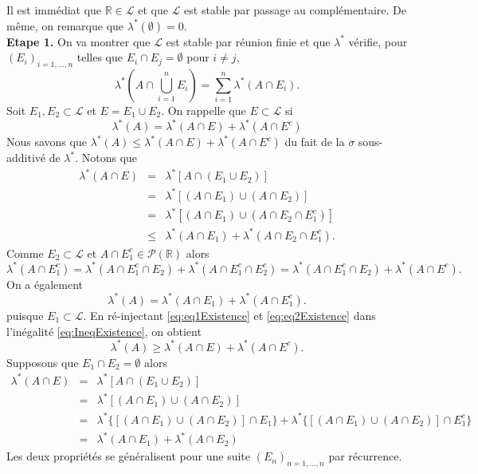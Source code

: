 \documentclass[8pt,notheorems]{beamer}
\def \R{\mathbb R}
\theoremstyle{definition}
\theoremstyle{example}
\theoremstyle{mystyle}
\theoremstyle{plain}
\begin{document}
\begin{frame}[allowframebreaks]
Il est immédiat que $\mathbb{R}\in \mathcal{L}$ et que $\mathcal{L}$ est stable par passage au complémentaire. De même, on remarque que $\lambda^{\ast}(\emptyset)=0$.\\
\textbf{Etape 1.} On va montrer que $\mathcal{L}$ est stable par réunion finie et que $\lambda^{\ast}$ vérifie, pour $(E_i)_{i=1,\ldots,n}$ telles que $E_i\cap E_j=\emptyset$ pour $i\neq j$,
$$\lambda^{\ast}\left(A\cap\bigcup_{i=1}^{n}E_i\right) =
\sum_{i=1}^{n}\lambda^{\ast}(A\cap E_i).
$$
Soit $E_1,E_2\subset\mathcal{L}$ et $E=E_1\cup E_2$. On rappelle que $E\subset\mathcal{L}$ si
$$
\lambda^{\ast}(A)=\lambda^{\ast}(A\cap E)+\lambda^{\ast}(A\cap E^{c})
$$
Nous savons que $\lambda^{\ast}(A)\leq\lambda^{\ast}(A\cap E)+\lambda^{\ast}(A\cap E^{c})$ du fait de la $\sigma$ sous-additivé de $\lambda^{\ast}$. Notons que
\begin{eqnarray}
\lambda^{\ast}(A\cap E)&=&\lambda^{\ast}[A\cap (E_1\cup E_2)]\nonumber\\
&=&\lambda^{\ast}[(A\cap E_1)\cup (A\cap E_2)]\nonumber\\
&=&\lambda^{\ast}[(A\cap E_1)\cup (A\cap E_2\cap E_1^{c})]\nonumber\\
&\leq& \lambda^{\ast}(A\cap E_1)+\lambda^{\ast}(A\cap E_2\cap E_1^{c}).\label{eq:IneqExistence}
\end{eqnarray}
Comme $E_{2}\subset\mathcal{L}$ et $A\cap E_{1}^{c}\in\mathcal{P}(\R)$ alors
\begin{equation}\label{eq:eq1Existence}
\lambda^{\ast}(A\cap E_{1}^{c})=\lambda^{\ast}(A\cap E_{1}^{c}\cap E_{2})+\lambda^{\ast}(A\cap E_{1}^{c}\cap E_{2}^{c})=\lambda^{\ast}(A\cap E_{1}^{c}\cap E_{2})+\lambda^{\ast}(A\cap E^{c}).
\end{equation}
On a également
\begin{equation}\label{eq:eq2Existence}
\lambda^{\ast}(A)=\lambda^{\ast}(A\cap E_{1})+\lambda^{\ast}(A\cap E_{1}^{c}).
\end{equation}
puisque $E_1\subset\mathcal{L}$. En ré-injectant \eqref{eq:eq1Existence} et \eqref{eq:eq2Existence} dans l'inégalité \eqref{eq:IneqExistence}, on obtient
$$
\lambda^{\ast}(A) \geq  \lambda^{\ast}(A\cap E) + \lambda^{\ast}(A\cap E^{c}).
$$
Supposons que $E_{1}\cap E_{2}=\emptyset$ alors
\begin{eqnarray*}
\lambda^{\ast}(A\cap E)&=&\lambda^{\ast}[A\cap(E_1\cup E_2)]\\
&=&\lambda^{\ast}[(A\cap E_1)\cup (A\cap E_2)]\\
&=&\lambda^{\ast}\{[(A\cap E_1)\cup (A\cap E_2)]\cap E_1\}+\lambda^{\ast}\{[(A\cap E_1)\cup (A\cap E_2)]\cap E_1^{c}\}\\
&=&\lambda^{\ast}(A\cap E_1)+\lambda^{\ast}(A\cap E_2)
\end{eqnarray*}
Les deux propriétés se généralisent pour une suite $(E_n)_{n=1,\ldots,n}$ par récurrence. \\
\end{frame}
\end{document}
